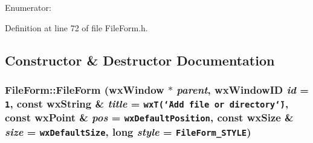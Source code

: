 \begin{Desc}
\item[Enumerator: ]\par
\begin{description}
\item[{\em 
ID\_\-EDDEST\label{class_file_form_b9c4f07e59d9066826681d0af87d3d070a449365727f065c3d822f7459286742}
}]\item[{\em 
ID\_\-LBLDEST\label{class_file_form_b9c4f07e59d9066826681d0af87d3d0757dbcb1178ba5fedf1c7d6363bfcc72a}
}]\item[{\em 
ID\_\-BTNLOAD\label{class_file_form_b9c4f07e59d9066826681d0af87d3d077d364f2ddfcdb7a6850cf2aa35a68649}
}]\item[{\em 
ID\_\-EDSOURCE\label{class_file_form_b9c4f07e59d9066826681d0af87d3d07ca9b5d6af70c3e0fe4e044fdaac4176b}
}]\item[{\em 
ID\_\-LBLSOURCE\label{class_file_form_b9c4f07e59d9066826681d0af87d3d070a7ed56c0cb696c3888239fc80583221}
}]\item[{\em 
ID\_\-DUMMY\_\-VALUE\_\-\label{class_file_form_b9c4f07e59d9066826681d0af87d3d07059f9261e8b1d5a186205c2da3ddb753}
}]\end{description}
\end{Desc}



Definition at line 72 of file File\-Form.h.

\subsection{Constructor \& Destructor Documentation}
\subsubsection{\setlength{\rightskip}{0pt plus 5cm}File\-Form::File\-Form (wx\-Window $\ast$ {\em parent}, wx\-Window\-ID {\em id} = {\tt 1}, const wx\-String \& {\em title} = {\tt wxT(\char`\"{}Add~file~or~directory\char`\"{})}, const wx\-Point \& {\em pos} = {\tt wxDefaultPosition}, const wx\-Size \& {\em size} = {\tt wxDefaultSize}, long {\em style} = {\tt FileForm\_\-STYLE})}\label{class_file_form_be963541ca6aa2e407efe6c59e8ac2ac}




